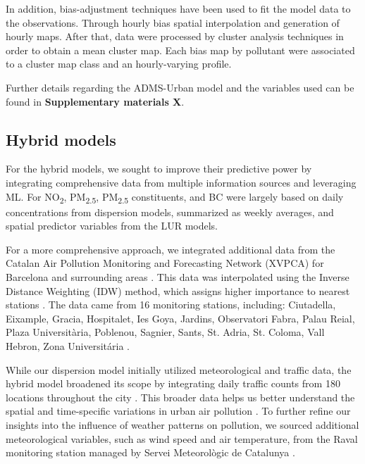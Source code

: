 \documentclass{article}
\begin{document}
In addition, bias-adjustment techniques have been used to fit the model data to the observations. Through hourly bias spatial interpolation and generation of hourly maps. After that, data were processed  by cluster analysis techniques in order to obtain a mean cluster map. Each bias map by pollutant were associated to a cluster map class and an hourly-varying profile. 

Further details regarding the ADMS-Urban model and the variables used can be found in \textbf{Supplementary materials X}.

\subsection{Hybrid models}

For the hybrid models, we sought to improve their predictive power by integrating comprehensive data from multiple information sources and leveraging ML. For NO\textsubscript{2}, PM\textsubscript{2.5}, PM\textsubscript{2.5} constituents, and BC were largely based on daily concentrations from dispersion models, summarized as weekly averages, and spatial predictor variables from the LUR models. 

For a more comprehensive approach, we integrated additional data from the Catalan Air Pollution Monitoring and Forecasting Network (XVPCA) for Barcelona and surrounding areas \cite{xarxa2012}. This data was interpolated using the Inverse Distance Weighting (IDW) method, which assigns higher importance to nearest stations \cite{hoek2017methods}. The data came from 16 monitoring stations, including: Ciutadella, Eixample, Gracia, Hospitalet, Ies Goya, Jardins, Observatori Fabra, Palau Reial, Plaza Universitària, Poblenou, Sagnier, Sants, St. Adria, St. Coloma, Vall Hebron, Zona Universitária \cite{xarxa2012}.

While our dispersion model initially utilized meteorological and traffic data, the hybrid model broadened its scope by integrating daily traffic counts from 180 locations throughout the city \cite{trafficbcn}. This broader data helps us better understand the spatial and time-specific variations in urban air pollution \cite{pinto2020}. To further refine our insights into the influence of weather patterns on pollution, we sourced additional meteorological variables, such as wind speed and air temperature, from the Raval monitoring station managed by Servei Meteorològic de Catalunya \cite{xema2013}.
\end{document}
